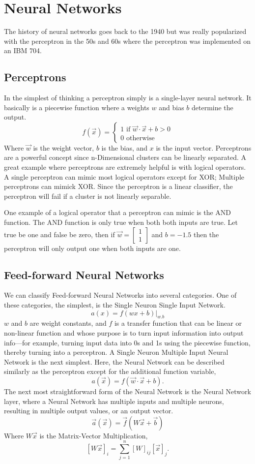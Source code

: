 \documentclass{article}
\begin{document}
\section{Neural Networks}

The history of neural networks goes back to the 1940 but was really popularized with the perceptron in the 50s and 60s where the perceptron was implemented on an IBM 704.

\subsection{Perceptrons}

In the simplest of thinking a perceptron simply is a single-layer neural network. It basically is a piecewise function where a weights $w$ and bias $b$ determine the output. $$f(\vec{x})=\begin{cases}
1 \mbox{ if } \vec{w}\cdot \vec{x}+b>0 \\
0 \mbox{ otherwise }
\end{cases}$$ Where $\vec{w}$  is the weight vector, $b$ is the bias, and $x$ is the input vector.  Perceptrons are a powerful concept since n-Dimensional clusters can be linearly separated. A great example where perceptrons are extremely helpful is with logical operators. A single perceptron can mimic most logical operators except for XOR; Multiple perceptrons can mimick XOR. Since the perceptron is a linear classifier, the perceptron will fail if a cluster is not linearly separable. 

One example of a logical operator that a perceptron can mimic is the AND function. The AND function is only true when both both inputs are true. Let true be one and false be zero, then if $\vec{w}=\begin{bmatrix}1 \\ 1\end{bmatrix}$ and $b=-1.5$ then the perceptron will only output one when both inputs are one.

\subsection{Feed-forward Neural Networks}

We can classify Feed-forward Neural Networks into several categories. One of these categories, the simplest, is the Single Neuron Single Input Network. 
$$a(x)=f(wx + b)|_{w.b}$$
$w$ and $b$ are weight constants, and $f$ is a transfer function that can be linear or non-linear function and whose purpose is to turn input information into output info—for example, turning input data into 0s and 1s using the piecewise function, thereby turning into a perceptron. A Single Neuron Multiple Input Neural Network is the next simplest. Here, the Neural Network can be described similarly as the perceptron except for the additional function variable, $$a(\vec{x})=f(\vec{w}\cdot \vec{x}+b).$$ The next most straightforward form of the Neural Network is the Neural Network layer, where a Neural Network has multiple inputs and multiple neurons, resulting in multiple output values, or an output vector. 
$$\vec{a}(\vec{x})=\vec{f}(W\vec{x}+\vec{b})$$ Where $W\vec{x}$ is the Matrix-Vector Multiplication, $$[W\vec{x}]_i=\sum_{j=1}^n [W]_{ij}[\vec{x}]_{j}.$$ 
\end{document}
